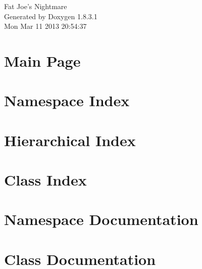 \documentclass{book}
\begin{document}
\hypersetup{pageanchor=false,citecolor=blue}
\begin{titlepage}
\vspace*{7cm}
\begin{center}
{\Large Fat Joe's Nightmare }\\
\vspace*{1cm}
{\large Generated by Doxygen 1.8.3.1}\\
\vspace*{0.5cm}
{\small Mon Mar 11 2013 20:54:37}\\
\end{center}
\end{titlepage}
\clearemptydoublepage
{}
\tableofcontents
\clearemptydoublepage
{}
\hypersetup{pageanchor=true,citecolor=blue}
\chapter{Main Page}
\label{index}\hypertarget{index}{}
\chapter{Namespace Index}

\chapter{Hierarchical Index}

\chapter{Class Index}

\chapter{Namespace Documentation}






\chapter{Class Documentation}

















\printindex
\end{document}
